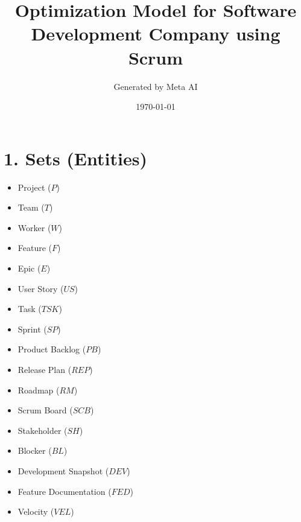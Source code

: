 \documentclass{article}
\title{Optimization Model for Software Development Company using Scrum}
\author{Generated by Meta AI}
\date{\today}
\begin{document}
\maketitle
\tableofcontents

\section{1. Sets (Entities)}
\begin{itemize}
    \item Project ($P$)
    \item Team ($T$)
    \item Worker ($W$)
    \item Feature ($F$)
    \item Epic ($E$)
    \item User Story ($US$)
    \item Task ($TSK$)
    \item Sprint ($SP$)
    \item Product Backlog ($PB$)
    \item Release Plan ($REP$)
    \item Roadmap ($RM$)
    \item Scrum Board ($SCB$)
    \item Stakeholder ($SH$)
    \item Blocker ($BL$)
    \item Development Snapshot ($DEV$)
    \item Feature Documentation ($FED$)
    \item Velocity ($VEL$)
\end{itemize}
\end{document}
